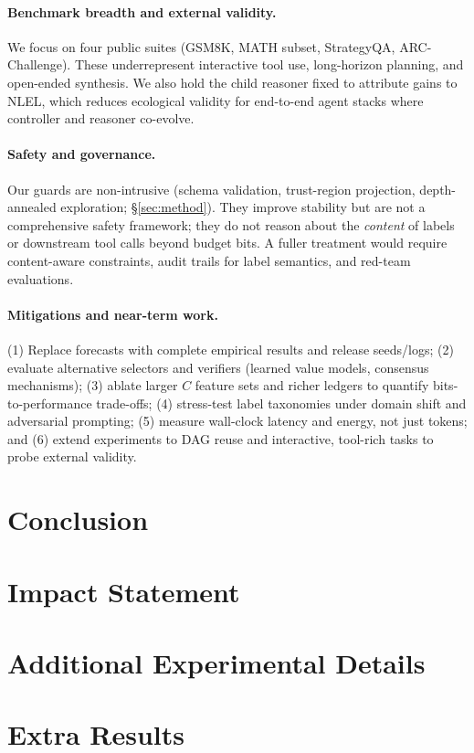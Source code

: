 \documentclass{article}
\theoremstyle{plain}
\theoremstyle{definition}
\theoremstyle{remark}
\begin{document}
\paragraph{Benchmark breadth and external validity.}
We focus on four public suites (GSM8K, MATH subset, StrategyQA, ARC-Challenge). These underrepresent interactive tool use, long-horizon planning, and open-ended synthesis. We also hold the child reasoner fixed to attribute gains to NLEL, which reduces ecological validity for end-to-end agent stacks where controller and reasoner co-evolve.

\paragraph{Safety and governance.}
Our guards are non-intrusive (schema validation, trust-region projection, depth-annealed exploration; \S\ref{sec:method}). They improve stability but are not a comprehensive safety framework; they do not reason about the \emph{content} of labels or downstream tool calls beyond budget bits. A fuller treatment would require content-aware constraints, audit trails for label semantics, and red-team evaluations.

\paragraph{Mitigations and near-term work.}
(1) Replace forecasts with complete empirical results and release seeds/logs;
(2) evaluate alternative selectors and verifiers (learned value models, consensus mechanisms);
(3) ablate larger $C$ feature sets and richer ledgers to quantify bits-to-performance trade-offs;
(4) stress-test label taxonomies under domain shift and adversarial prompting;
(5) measure wall-clock latency and energy, not just tokens; and
(6) extend experiments to DAG reuse and interactive, tool-rich tasks to probe external validity.
\section{Conclusion}

\section*{Impact Statement}





\appendix

\section{Additional Experimental Details}
\section{Extra Results}
\end{document}
